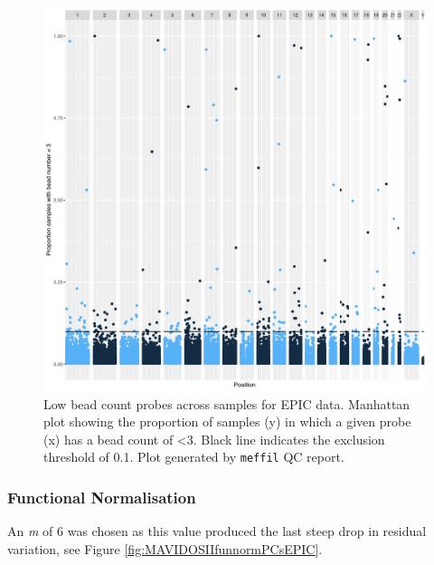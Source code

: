 \documentclass[
]{book}
\begin{document}
\begin{figure}

{\centering \includegraphics[width=0.8\linewidth]{figs/MAVIDOS-II-qcEPICbeadNumAcross} 

}

\caption{Low bead count probes across samples for EPIC data. Manhattan plot showing the proportion of samples (y) in which a given probe (x) has a bead count of \textless3. Black line indicates the exclusion threshold of 0.1. Plot generated by \texttt{meffil} QC report.}\label{fig:MAVIDOSIIqcEPICbeadNumAcross}
\end{figure}



\hypertarget{functional-normalisation-2}{%
\subsubsection{Functional Normalisation}\label{functional-normalisation-2}}

An \emph{m} of 6 was chosen as this value produced the last steep drop in residual variation, see Figure \ref{fig:MAVIDOSIIfunnormPCsEPIC}.
\end{document}
